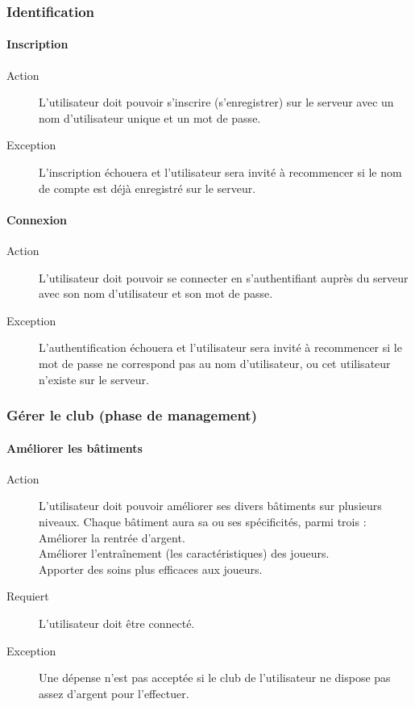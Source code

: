 \documentclass[a4paper]{article}
\begin{document}
\subsubsection{Identification}
\paragraph{Inscription}
\begin{description}
\item[Action] L'\gls{utilisateur} doit pouvoir s'inscrire (s'enregistrer) sur le \gls{serveur} avec un nom d'\gls{utilisateur} unique et un mot de passe.
\item[Exception] L'inscription échouera et l'\gls{utilisateur} sera invité à recommencer si le nom de compte est déjà enregistré sur le \gls{serveur}.
\end{description}

\paragraph{Connexion}
\begin{description}
\item[Action] L'\gls{utilisateur} doit pouvoir se connecter en s'authentifiant auprès du \gls{serveur} avec son nom d'\gls{utilisateur} et son mot de passe.
\item[Exception] L'authentification échouera et l'\gls{utilisateur} sera invité à recommencer si le mot de passe ne correspond pas au nom d'\gls{utilisateur}, ou cet \gls{utilisateur} n'existe sur le \gls{serveur}.
\end{description}

\subsubsection{Gérer le \gls{club} (phase de management)}
\paragraph{Améliorer les bâtiments}
\begin{description}
\item[Action] L'\gls{utilisateur} doit pouvoir améliorer ses divers bâtiments sur plusieurs niveaux. Chaque bâtiment aura sa ou ses spécificités, parmi trois :\\
Améliorer la rentrée d'argent.\\
Améliorer l'entraînement (les caractéristiques) des joueurs.\\
Apporter des soins plus efficaces aux joueurs.
\item[Requiert] L'\gls{utilisateur} doit être connecté.
\item[Exception] Une dépense n'est pas acceptée si le \gls{club} de l'\gls{utilisateur} ne dispose pas assez d'argent pour l'effectuer.
\end{description}
\end{document}
